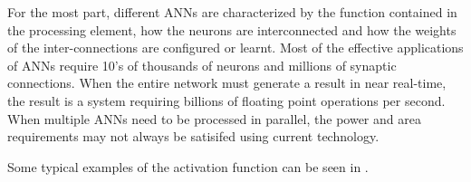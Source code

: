 For the most part, different ANNs are characterized by the function contained in the
processing element, how the neurons are interconnected and how the weights of the inter-connections are configured or learnt.
Most of the effective applications of ANNs require 10's of thousands of neurons and millions of synaptic connections.
When the entire network must generate a result in near real-time, the result is a system requiring billions
of floating point operations per second. When multiple ANNs need to be processed in parallel, the power and area requirements may not always be satisifed
using current technology.

\iftrue
Some typical examples of the 
activation function can be seen in .

